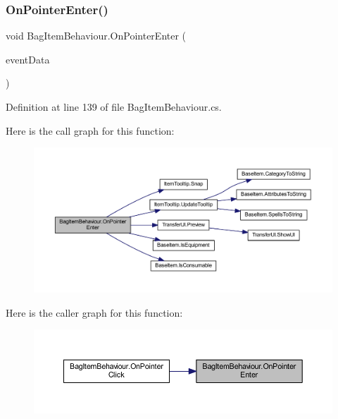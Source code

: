 \subsubsection{\texorpdfstring{OnPointerEnter()}{OnPointerEnter()}}
{\footnotesize\ttfamily void Bag\+Item\+Behaviour.\+On\+Pointer\+Enter (\begin{DoxyParamCaption}\item[{Pointer\+Event\+Data}]{event\+Data }\end{DoxyParamCaption})}



Definition at line 139 of file Bag\+Item\+Behaviour.\+cs.

Here is the call graph for this function\+:
\nopagebreak
\begin{figure}[H]
\begin{center}
\leavevmode
\includegraphics[width=350pt]{class_bag_item_behaviour_a9dd6c0fb07dd87363f0198070a16cff7_cgraph}
\end{center}
\end{figure}
Here is the caller graph for this function\+:
\nopagebreak
\begin{figure}[H]
\begin{center}
\leavevmode
\includegraphics[width=350pt]{class_bag_item_behaviour_a9dd6c0fb07dd87363f0198070a16cff7_icgraph}
\end{center}
\end{figure}
\mbox{\label{class_bag_item_behaviour_a94a401c7a518b7ed17e5648153d6f1b6}} 
